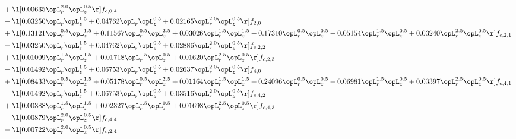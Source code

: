 \begin{alignat}{2}
& + \l[  0.00635 \opL_r^{2.0} \opL_z^{0.5}  \r] f_{c,0,4} \nonumber \\ 
& - \l[  0.03250 \opL_r \opL_z^{1.5} +  0.04762 \opL_r \opL_z^{0.5} +  0.02165 \opL_r^{2.0} \opL_z^{0.5}  \r] f_{2,0} \nonumber \\ 
& + \l[  0.13121 \opL_r^{0.5} \opL_z^{1.5} +  0.11567 \opL_r^{0.5} \opL_z^{2.5} +  0.03026 \opL_r^{1.5} \opL_z^{1.5} +  0.17310 \opL_r^{0.5} \opL_z^{0.5} +  0.05154 \opL_r^{1.5} \opL_z^{0.5} +  0.03240 \opL_r^{2.5} \opL_z^{0.5}  \r] f_{c,2,1} \nonumber \\ 
& - \l[  0.03250 \opL_r \opL_z^{1.5} +  0.04762 \opL_r \opL_z^{0.5} +  0.02886 \opL_r^{2.0} \opL_z^{0.5}  \r] f_{c,2,2} \nonumber \\ 
& + \l[  0.01009 \opL_r^{1.5} \opL_z^{1.5} +  0.01718 \opL_r^{1.5} \opL_z^{0.5} +  0.01620 \opL_r^{2.5} \opL_z^{0.5}  \r] f_{c,2,3} \nonumber \\ 
& - \l[  0.01492 \opL_r \opL_z^{1.5} +  0.06753 \opL_r \opL_z^{0.5} +  0.02637 \opL_r^{2.0} \opL_z^{0.5}  \r] f_{4,0} \nonumber \\ 
& + \l[  0.08433 \opL_r^{0.5} \opL_z^{1.5} +  0.05178 \opL_r^{0.5} \opL_z^{2.5} +  0.01164 \opL_r^{1.5} \opL_z^{1.5} +  0.24096 \opL_r^{0.5} \opL_z^{0.5} +  0.06981 \opL_r^{1.5} \opL_z^{0.5} +  0.03397 \opL_r^{2.5} \opL_z^{0.5}  \r] f_{c,4,1} \nonumber \\ 
& - \l[  0.01492 \opL_r \opL_z^{1.5} +  0.06753 \opL_r \opL_z^{0.5} +  0.03516 \opL_r^{2.0} \opL_z^{0.5}  \r] f_{c,4,2} \nonumber \\ 
& + \l[  0.00388 \opL_r^{1.5} \opL_z^{1.5} +  0.02327 \opL_r^{1.5} \opL_z^{0.5} +  0.01698 \opL_r^{2.5} \opL_z^{0.5}  \r] f_{c,4,3} \nonumber \\ 
& - \l[  0.00879 \opL_r^{2.0} \opL_z^{0.5}  \r] f_{c,4,4} \nonumber \\ 
& - \l[  0.00722 \opL_r^{2.0} \opL_z^{0.5}  \r] f_{c,2,4} \nonumber \\ 
\end{alignat} 


